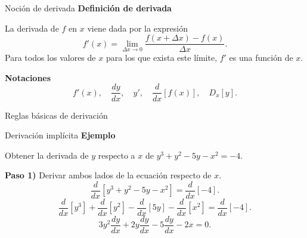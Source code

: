 \documentclass[original_version/main.tex]{subfiles}
\begin{document}
\graphicspath{{imagenes/tema2/}{../imagenes/tema2/}}

\begin{frame}{Noción de derivada}
\textbf{Definición de derivada}\par
La derivada de $f$ en $x$ viene dada por la expresión
\[f'(x)=\lim_{\Delta x\to0}\frac{f(x+\Delta x)-f(x)}{\Delta x}.\]
Para todos los valores de $x$ para los que exista este límite, $f'$ es una función de $x$.
\medskip

\textbf{Notaciones}
\[f'(x),\quad\frac{dy}{dx},\quad y',\quad\frac{d}{dx}[f(x)],\quad D_x[y].\]
\end{frame}
\begin{frame}{Reglas básicas de derivación}
\scriptsize\renewcommand{\arraystretch}{1.4}
\end{frame}
\begin{frame}{Derivación implícita}
\textbf{Ejemplo}\par Obtener la derivada de $y$ respecto a $x$ de $y^3+y^2-5y-x^2=-4$.\medskip

\textbf{Paso 1)} Derivar ambos lados de la ecuación respecto de $x$.
\[\frac{d}{dx}[y^3+y^2-5y-x^2]=\frac{d}{dx}[-4].\]
\[\frac{d}{dx}[y^3]+\frac{d}{dx}[y^2]-\frac{d}{dx}[5y]-\frac{d}{dx}[x^2]=\frac{d}{dx}[-4].\]
\[3y^2\frac{dy}{dx}+2y\frac{dy}{dx}-5\frac{dy}{dx}-2x=0.\]
\end{frame}
\end{document}
